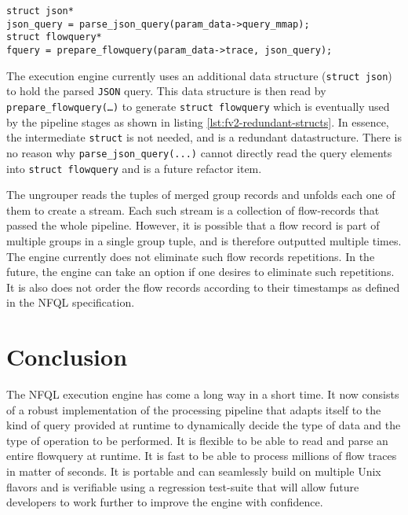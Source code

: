 \begin{lstlisting}
struct json*
json_query = parse_json_query(param_data->query_mmap);
struct flowquery*
fquery = prepare_flowquery(param_data->trace, json_query);
\end{lstlisting}

The execution engine currently uses an additional data structure
(\texttt{struct json}) to hold the parsed \texttt{JSON} query. This data
structure is then read by \texttt{prepare\_flowquery(\ldots)} to generate
\texttt{struct flowquery} which is eventually  used by the pipeline stages as shown in listing
\ref{lst:fv2-redundant-structs}. In essence, the intermediate \texttt{struct}
is not needed, and is a redundant datastructure. There is no reason why
\texttt{parse\_json\_query(...)} cannot directly read the query elements into
\texttt{struct flowquery} and is a future refactor item.

The ungrouper reads the tuples of merged group records and unfolds each one of
them to create a stream. Each such stream is a collection of flow-records that
 passed the whole
pipeline. However, it is possible that a flow record is part of multiple
groups in a single group tuple, and is therefore outputted multiple times. The
engine currently does not eliminate such flow records repetitions. In the
future, the engine can take an option if one desires to eliminate such
repetitions. It is also does not order the flow records according to their
timestamps as defined in the \ac{NFQL} specification.


\section{Conclusion}\label{sec:conclusion}

The \ac{NFQL} execution engine has come a long way in a short time. It now
consists of a robust implementation of the processing pipeline that adapts
itself to the kind of query provided at runtime to dynamically decide the type
of data and the type of operation to be performed. It is flexible to be able
to read and parse an entire flowquery at runtime. It is fast to be able to
process millions of flow traces in matter of seconds. It is portable and can
seamlessly build on multiple Unix flavors and is verifiable using a regression
test-suite that will allow future developers to work further to improve the
engine with confidence.
